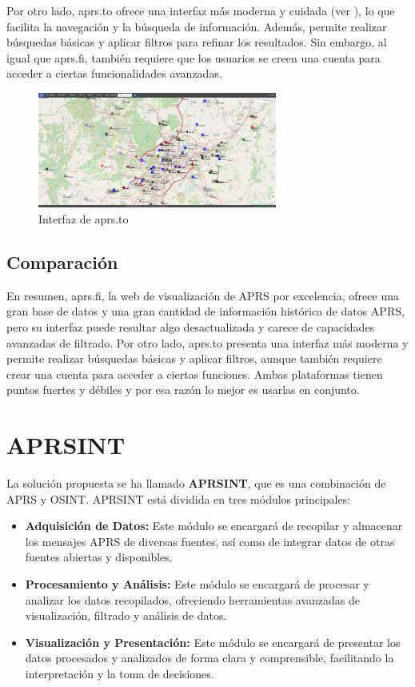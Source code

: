 Por otro lado, aprs.to ofrece una interfaz más moderna y cuidada (ver ), lo que facilita la navegación y la búsqueda de información. Además, permite realizar búsquedas básicas y aplicar filtros para refinar los resultados. Sin embargo, al igual que aprs.fi, también requiere que los usuarios se creen una cuenta para acceder a ciertas funcionalidades avanzadas.

\begin{figure}[h]
    \centering
    \includegraphics[width=0.7\textwidth]{Imagenes/Chapter_2/aprs-to.png}
    \caption{Interfaz de aprs.to}
    \label{fig:aprs-to}
\end{figure}

\subsection{Comparación}

En resumen, aprs.fi, la web de visualización de APRS por excelencia, ofrece una gran base de datos y una gran cantidad de información histórica de datos APRS, pero su interfaz puede resultar algo desactualizada y carece de capacidades avanzadas de filtrado. Por otro lado, aprs.to presenta una interfaz más moderna y permite realizar búsquedas básicas y aplicar filtros, aunque también requiere crear una cuenta para acceder a ciertas funciones. Ambas plataformas tienen puntos fuertes y débiles y por esa razón lo mejor es usarlas en conjunto.


\section{APRSINT}
La solución propuesta se ha llamado \textbf{APRSINT}, que es una combinación de APRS y OSINT. APRSINT está dividida en tres módulos principales:
\begin{itemize}
	\item \textbf{Adquisición de Datos:} Este módulo se encargará de recopilar y almacenar los mensajes APRS de diversas fuentes, así como de integrar datos de otras fuentes abiertas y disponibles.
	\item \textbf{Procesamiento y Análisis:} Este módulo se encargará de procesar y analizar los datos recopilados, ofreciendo herramientas avanzadas de visualización, filtrado y análisis de datos.
	\item \textbf{Visualización y Presentación:} Este módulo se encargará de presentar los datos procesados y analizados de forma clara y comprensible, facilitando la interpretación y la toma de decisiones.
\end{itemize}

